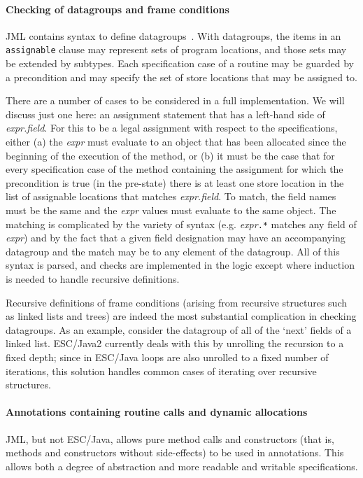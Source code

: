 \documentclass{llncs}
\begin{document}
\paragraph*{Checking of datagroups and frame conditions}
JML contains syntax to define 
datagroups~\cite{Leino-Poetzsch-Heffter-Zhou02}.  With datagroups, the items in
an \texttt{assignable} clause may represent sets of program locations,
and those sets may be extended by subtypes.  Each
specification case of a routine may be guarded by a
precondition and may specify the set of store locations that may be
assigned to.

There are a number of cases to be considered in a full implementation.
We will discuss just one here: an assignment statement that has a
left-hand side of \textit{expr.field}.  For this to be a legal
assignment with respect to the specifications, either (a) the
\textit{expr} must evaluate to an object that has been allocated since
the beginning of the execution of the method, or (b) it must be the
case that for every specification case of the method containing the
assignment for which the precondition is true (in the pre-state) there
is at least one store location in the list of assignable locations
that matches \textit{expr.field}.  To match, the field names must be
the same and the \textit{expr} values must evaluate to the same
object.  The matching is complicated by the variety of syntax (e.g.
\textit{expr}\texttt{.*} matches any field of \textit{expr}) and by
the fact that a given field designation may have an accompanying
datagroup and the match may be to any element of the datagroup.
All of this syntax is parsed, and checks are implemented in the logic except
where induction is needed to handle recursive definitions.

Recursive definitions of frame conditions (arising from recursive structures
such as linked lists and trees) are indeed the most substantial complication 
in checking datagroups.  As an example,
consider the datagroup of all of the `next' fields of a linked list.
ESC/Java2 currently deals with this by unrolling the recursion to a
fixed depth; since in ESC/Java loops are also unrolled to a fixed
number of iterations, this solution handles common cases of iterating
over recursive structures.

\paragraph*{Annotations containing routine calls and dynamic allocations}
JML, but not ESC/Java, allows pure method calls and constructors (that is, methods
and constructors without side-effects) to be
used in annotations.  This allows both a degree of abstraction and
more readable and writable specifications.
\end{document}
